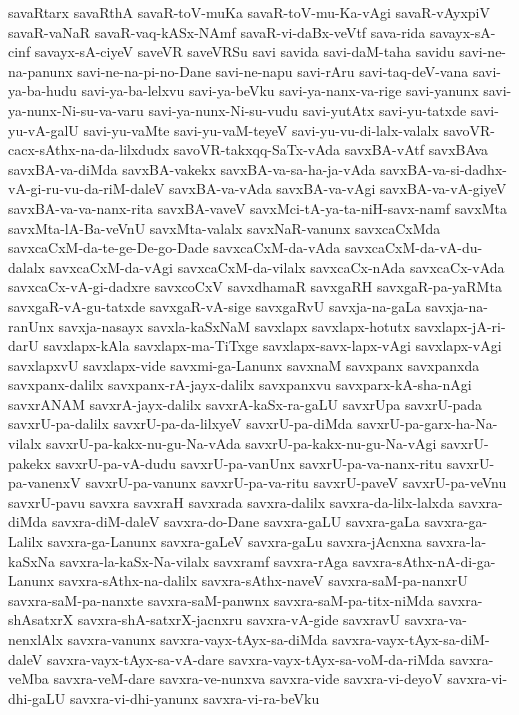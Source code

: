{savaRtarx
savaRthA
savaR-toV-muKa
savaR-toV-mu-Ka-vAgi
savaR-vAyxpiV
savaR-vaNaR
savaR-vaq-kASx-NAmf
savaR-vi-daBx-veVtf
sava-rida
savayx-sA-cinf
savayx-sA-ciyeV
saveVR
saveVRSu
savi
savida
savi-daM-taha
savidu
savi-ne-na-panunx
savi-ne-na-pi-no-Dane
savi-ne-napu
savi-rAru
savi-taq-deV-vana
savi-ya-ba-hudu
savi-ya-ba-lelxvu
savi-ya-beVku
savi-ya-nanx-va-rige
savi-yanunx
savi-ya-nunx-Ni-su-va-varu
savi-ya-nunx-Ni-su-vudu
savi-yutAtx
savi-yu-tatxde
savi-yu-vA-galU
savi-yu-vaMte
savi-yu-vaM-teyeV
savi-yu-vu-di-lalx-valalx
savoVR-cacx-sAthx-na-da-lilxdudx
savoVR-takxqq-SaTx-vAda
savxBA-vAtf
savxBAva
savxBA-va-diMda
savxBA-vakekx
savxBA-va-sa-ha-ja-vAda
savxBA-va-si-dadhx-vA-gi-ru-vu-da-riM-daleV
savxBA-va-vAda
savxBA-va-vAgi
savxBA-va-vA-giyeV
savxBA-va-va-nanx-rita
savxBA-vaveV
savxMci-tA-ya-ta-niH-savx-namf
savxMta
savxMta-lA-Ba-veVnU
savxMta-valalx
savxNaR-vanunx
savxcaCxMda
savxcaCxM-da-te-ge-De-go-Dade
savxcaCxM-da-vAda
savxcaCxM-da-vA-du-dalalx
savxcaCxM-da-vAgi
savxcaCxM-da-vilalx
savxcaCx-nAda
savxcaCx-vAda
savxcaCx-vA-gi-dadxre
savxcoCxV
savxdhamaR
savxgaRH
savxgaR-pa-yaRMta
savxgaR-vA-gu-tatxde
savxgaR-vA-sige
savxgaRvU
savxja-na-gaLa
savxja-na-ranUnx
savxja-nasayx
savxla-kaSxNaM
savxlapx
savxlapx-hotutx
savxlapx-jA-ri-darU
savxlapx-kAla
savxlapx-ma-TiTxge
savxlapx-savx-lapx-vAgi
savxlapx-vAgi
savxlapxvU
savxlapx-vide
savxmi-ga-Lanunx
savxnaM
savxpanx
savxpanxda
savxpanx-dalilx
savxpanx-rA-jayx-dalilx
savxpanxvu
savxparx-kA-sha-nAgi
savxrANAM
savxrA-jayx-dalilx
savxrA-kaSx-ra-gaLU
savxrUpa
savxrU-pada
savxrU-pa-dalilx
savxrU-pa-da-lilxyeV
savxrU-pa-diMda
savxrU-pa-garx-ha-Na-vilalx
savxrU-pa-kakx-nu-gu-Na-vAda
savxrU-pa-kakx-nu-gu-Na-vAgi
savxrU-pakekx
savxrU-pa-vA-dudu
savxrU-pa-vanUnx
savxrU-pa-va-nanx-ritu
savxrU-pa-vanenxV
savxrU-pa-vanunx
savxrU-pa-va-ritu
savxrU-paveV
savxrU-pa-veVnu
savxrU-pavu
savxra
savxraH
savxrada
savxra-dalilx
savxra-da-lilx-lalxda
savxra-diMda
savxra-diM-daleV
savxra-do-Dane
savxra-gaLU
savxra-gaLa
savxra-ga-Lalilx
savxra-ga-Lanunx
savxra-gaLeV
savxra-gaLu
savxra-jAcnxna
savxra-la-kaSxNa
savxra-la-kaSx-Na-vilalx
savxramf
savxra-rAga
savxra-sAthx-nA-di-ga-Lanunx
savxra-sAthx-na-dalilx
savxra-sAthx-naveV
savxra-saM-pa-nanxrU
savxra-saM-pa-nanxte
savxra-saM-panwnx
savxra-saM-pa-titx-niMda
savxra-shAsatxrX
savxra-shA-satxrX-jacnxru
savxra-vA-gide
savxravU
savxra-va-nenxlAlx
savxra-vanunx
savxra-vayx-tAyx-sa-diMda
savxra-vayx-tAyx-sa-diM-daleV
savxra-vayx-tAyx-sa-vA-dare
savxra-vayx-tAyx-sa-voM-da-riMda
savxra-veMba
savxra-veM-dare
savxra-ve-nunxva
savxra-vide
savxra-vi-deyoV
savxra-vi-dhi-gaLU
savxra-vi-dhi-yanunx
savxra-vi-ra-beVku
}

